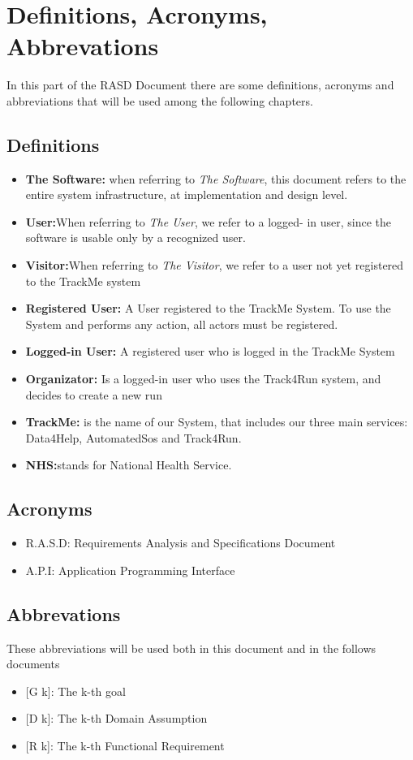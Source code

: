 \section{Definitions, Acronyms, Abbrevations}
In this part of the RASD Document there are some definitions, acronyms and abbreviations that will be used among the following chapters.
\subsection{Definitions}
\begin{itemize}
	\item \textbf{The Software:} when referring to \emph{The Software}, this document refers to the entire system infrastructure, at implementation and design level.

\item \textbf{User:}When referring to \emph{The User}, we refer to a logged- in user, since the software is usable only by a recognized user. 

\item \textbf{Visitor:}When referring to \emph{The Visitor}, we refer to a user not yet registered to the TrackMe system

\item \textbf{Registered User:} A User registered to the TrackMe System. To use the System and performs any action, all actors must be registered. 

\item\textbf{Logged-in User:} A registered user who is logged in the TrackMe System

\item\textbf{Organizator:} Is a logged-in  user who uses the Track4Run system, and decides to create a new run

\item\textbf{TrackMe:}
is the name of our System, that  includes our three main services: Data4Help, AutomatedSos and Track4Run.

\item\textbf{NHS:}stands for National Health Service.


	
	\end{itemize}
\subsection{Acronyms}

\begin{itemize}
  \item R.A.S.D: Requirements Analysis and Specifications Document
  \item A.P.I: Application Programming Interface 
\end{itemize}

\subsection{Abbrevations}
These abbreviations will be used both in this document and in the follows documents
\begin{itemize}
	\item {[}G k{]}: The k-th goal
    \item {[}D k{]}: The k-th Domain Assumption
    \item {[}R k{]}: The k-th Functional Requirement
\end{itemize}
